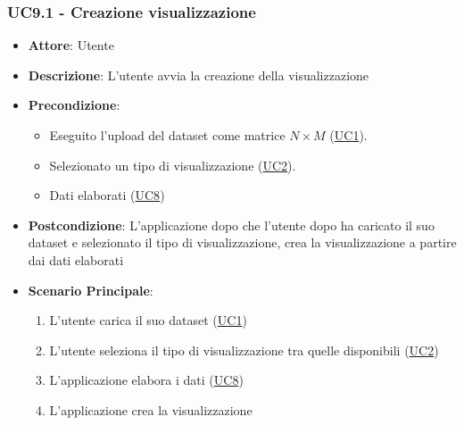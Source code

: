     \subsubsection{UC9.1 - Creazione visualizzazione}
    \label{uc9.1}
    \begin{itemize}
    \item \textbf{Attore}: Utente
    \item \textbf{Descrizione}:  L'utente avvia la creazione della visualizzazione
    \item \textbf{Precondizione}: 
    \begin{itemize}
        \item Eseguito l'upload del dataset come matrice $N\times M$ (\hyperref[uc1]{UC1}).
        \item Selezionato un tipo di visualizzazione (\hyperref[uc2]{UC2}).
        \item Dati elaborati (\hyperref[uc8]{UC8})
    \end{itemize}  
    \item \textbf{Postcondizione}: L'applicazione dopo che l'utente dopo ha caricato il suo dataset e selezionato il tipo di visualizzazione, crea la visualizzazione a partire dai dati elaborati
    \item \textbf{Scenario Principale}: 
    \begin{enumerate}
        \item L'utente carica il suo dataset (\hyperref[uc1]{UC1})
        \item L'utente seleziona il tipo di visualizzazione tra quelle disponibili (\hyperref[uc2]{UC2})
        \item L'applicazione elabora i dati (\hyperref[uc8]{UC8})
        \item L'applicazione crea la visualizzazione
    \end{enumerate}
    \end{itemize}
    
